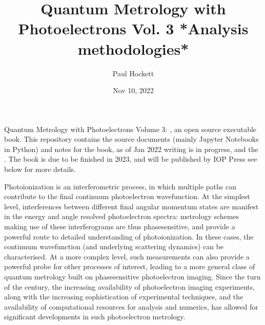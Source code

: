 \documentclass[letterpaper,10pt,english]{jupyterBook}
\title{Quantum Metrology with Photoelectrons Vol. 3 *Analysis methodologies*}
\date{Nov 10, 2022}
\author{Paul Hockett}
\begin{document}
\pagestyle{empty}
\sphinxmaketitle
\pagestyle{plain}
\sphinxtableofcontents
\pagestyle{normal}
\label{\detokenize{intro::doc}}


\sphinxAtStartPar
Quantum Metrology with Photoelectrons Volume 3: , an open source executable book. This repository contains the source documents (mainly Jupyter Notebooks in Python) and notes for the book, as of Jan 2022 writing is in progress, and the . The book is due to be finished in 2023, and will be published by IOP Press \sphinxhyphen{} see below for more details.

\begin{DUlineblock}{0em}
\item[] 
\end{DUlineblock}

\sphinxAtStartPar
Photoionization is an interferometric process, in which multiple paths can contribute to the final continuum photoelectron wavefunction. At the simplest level, interferences between different final angular momentum states are manifest in the energy and angle resolved photoelectron spectra: metrology schemes making use of these interferograms are thus phase\sphinxhyphen{}sensitive, and provide a powerful route to detailed understanding of photoionization. In these cases, the continuum wavefunction (and underlying scattering dynamics) can be characterised. At a more complex level, such measurements can also provide a powerful probe for other processes of interest, leading to a more general class of quantum metrology built on phase\sphinxhyphen{}sensitive photoelectron imaging.  Since the turn of the century, the increasing availability of photoelectron imaging experiments, along with the increasing sophistication of experimental techniques, and the availability of computational resources for analysis and numerics, has allowed for significant developments in such photoelectron metrology.

\begin{DUlineblock}{0em}
\item[] 
\end{DUlineblock}
\end{document}
